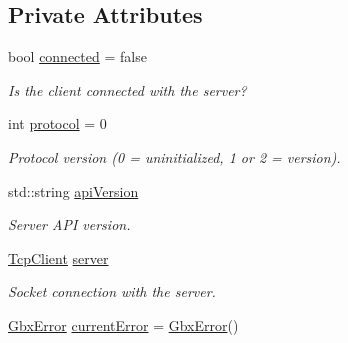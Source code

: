 \subsection*{Private Attributes}
\begin{DoxyCompactItemize}
\item 
\hypertarget{classGbxRemote_a56662ea222345c645ae897e056b5c8c8}{bool \hyperlink{classGbxRemote_a56662ea222345c645ae897e056b5c8c8}{connected} = false}\label{classGbxRemote_a56662ea222345c645ae897e056b5c8c8}

\begin{DoxyCompactList}\small\item\em Is the client connected with the server? \end{DoxyCompactList}\item 
\hypertarget{classGbxRemote_a5ee5c7087085cb6cb2e7bc6135ff0646}{int \hyperlink{classGbxRemote_a5ee5c7087085cb6cb2e7bc6135ff0646}{protocol} = 0}\label{classGbxRemote_a5ee5c7087085cb6cb2e7bc6135ff0646}

\begin{DoxyCompactList}\small\item\em Protocol version (0 = uninitialized, 1 or 2 = version). \end{DoxyCompactList}\item 
\hypertarget{classGbxRemote_a81d3c0c70ab7f5e585840e9978ee900e}{std\-::string \hyperlink{classGbxRemote_a81d3c0c70ab7f5e585840e9978ee900e}{api\-Version}}\label{classGbxRemote_a81d3c0c70ab7f5e585840e9978ee900e}

\begin{DoxyCompactList}\small\item\em Server A\-P\-I version. \end{DoxyCompactList}\item 
\hypertarget{classGbxRemote_a0b0b212b945da4266fb645affdac81cb}{\hyperlink{classTcpClient}{Tcp\-Client} \hyperlink{classGbxRemote_a0b0b212b945da4266fb645affdac81cb}{server}}\label{classGbxRemote_a0b0b212b945da4266fb645affdac81cb}

\begin{DoxyCompactList}\small\item\em Socket connection with the server. \end{DoxyCompactList}\item 
\hypertarget{classGbxRemote_a5c310edc409e31aa12c0c0664b0fd238}{\hyperlink{structGbxError}{Gbx\-Error} \hyperlink{classGbxRemote_a5c310edc409e31aa12c0c0664b0fd238}{current\-Error} = \hyperlink{structGbxError}{Gbx\-Error}()}\label{classGbxRemote_a5c310edc409e31aa12c0c0664b0fd238}


\end{DoxyCompactItemize}
